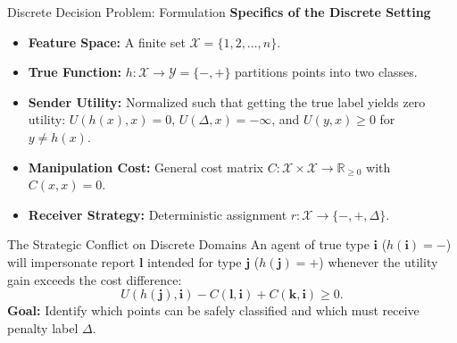 \documentclass[aspectratio=169, 11pt, t, xcolor=table]{beamer}
\newcommand{\R}{\mathbb{R}}
\newcommand{\cg}[1]{\mathcal{#1}}
\newcommand{\minus}{\mathbf{-}}
\newcommand{\plus}{\mathbf{+}}
\newcommand{\ibb}{\mathbf{i}}
\newcommand{\jbb}{\mathbf{j}}
\newcommand{\kbb}{\mathbf{k}}
\newcommand{\lbb}{\mathbf{l}}
\begin{document}
\begin{frame}{Discrete Decision Problem: Formulation}
\small
\textbf{Specifics of the Discrete Setting}
\begin{itemize}\itemsep=2pt
  \item \textbf{Feature Space:} A finite set $\cg{X} = \{1, 2, \ldots, n\}$.
  \item \textbf{True Function:} $h: \cg{X} \to \cg{Y} = \{\minus, \plus\}$ partitions points into two classes.
  \item \textbf{Sender Utility:} Normalized such that getting the true label yields zero utility:
    $U(h(x), x) = 0$, $U(\Delta, x) = -\infty$, and $U(y, x) \ge 0$ for $y \ne h(x)$.
  \item \textbf{Manipulation Cost:} General cost matrix $C: \cg{X} \times \cg{X} \to \R_{\ge 0}$ with $C(x,x) = 0$.
  \item \textbf{Receiver Strategy:} Deterministic assignment $r: \cg{X} \to \{\minus, \plus, \Delta\}$.
\end{itemize}

\par\vspace{0.4em}
\begin{alertblock}{The Strategic Conflict on Discrete Domains}
\footnotesize
An agent of true type $\ibb$ ($h(\ibb) = \minus$) will impersonate report $\lbb$ intended for type $\jbb$ ($h(\jbb) = \plus$) whenever the utility gain exceeds the cost difference:
\[
  U(h(\jbb), \ibb) - C(\lbb, \ibb) + C(\kbb, \ibb) \ge 0.
\]
\textbf{Goal:} Identify which points can be safely classified and which must receive penalty label $\Delta$.
\end{alertblock}
\end{frame}
\end{document}
